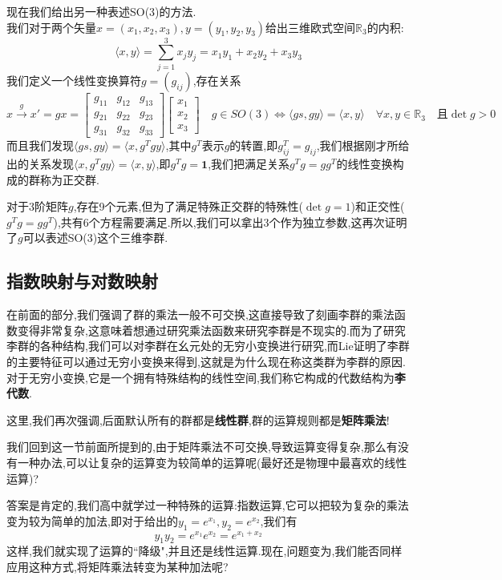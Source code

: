 \begin{example}
	现在我们给出另一种表述SO(3)的方法.\\
	我们对于两个矢量$x=(x_1,x_2,x_3),y=(y_1,y_2,y_3)$给出三维欧式空间$\mathbb{R}_3$的内积:
	\begin{equation}
		\langle x,y\rangle=\sum_{j=1}^{3}x_j y_j=x_1y_1+x_2y_2+x_3y_3
	\end{equation}
	我们定义一个线性变换算符$g=(g_{ij})$,存在关系
	\begin{equation}
		x\xrightarrow{g}x'=gx=\begin{bmatrix}g_{11}&g_{12}&g_{13}\\g_{21}&g_{22}&g_{23}\\g_{31}&g_{32}&g_{33}\end{bmatrix}\begin{bmatrix}x_1\\x_2\\x_3\end{bmatrix}\quad g\in SO(3)\Leftrightarrow\langle gs,gy\rangle=\langle x,y\rangle\quad\forall x,y\in\mathbb{R}_3\quad\text{且}\det g>0
	\end{equation}
	而且我们发现$\langle gs,gy\rangle=\langle x,g^Tgy\rangle$,其中$g^T$表示$g$的转置,即$g_{ij}^T=g_{ij}$,我们根据刚才所给出的关系发现$\langle x,g^Tgy\rangle=\langle x,y\rangle$,即$g^Tg=\textbf{1}$,我们把满足关系$g^Tg=gg^T$的线性变换构成的群称为正交群.
	
	对于3阶矩阵$g$,存在9个元素,但为了满足特殊正交群的特殊性($\det g=1$)和正交性($g^Tg=gg^T$),共有6个方程需要满足.所以,我们可以拿出3个作为独立参数,这再次证明了$g$可以表述SO(3)这个三维李群.
\end{example}
\subsection{指数映射与对数映射}
在前面的部分,我们强调了群的乘法一般不可交换,这直接导致了刻画李群的乘法函数变得非常复杂,这意味着想通过研究乘法函数来研究李群是不现实的.而为了研究李群的各种结构,我们可以对李群在幺元处的无穷小变换进行研究,而Lie证明了李群的主要特征可以通过无穷小变换来得到,这就是为什么现在称这类群为李群的原因.对于无穷小变换,它是一个拥有特殊结构的线性空间,我们称它构成的代数结构为\textbf{李代数}.

这里,我们再次强调,后面默认所有的群都是\textbf{线性群},群的运算规则都是\textbf{矩阵乘法}!

我们回到这一节前面所提到的,由于矩阵乘法不可交换,导致运算变得复杂,那么有没有一种办法,可以让复杂的运算变为较简单的运算呢(最好还是物理中最喜欢的线性运算)?

答案是肯定的,我们高中就学过一种特殊的运算:指数运算,它可以把较为复杂的乘法变为较为简单的加法,即对于给出的$y_1=e^{x_1},y_2=e^{x_2}$,我们有
\begin{equation}
	y_1y_2=e^{x_1}e^{x_2}=e^{x_1+x_2}
\end{equation}
这样,我们就实现了运算的``降级",并且还是线性运算.现在,问题变为,我们能否同样应用这种方式,将矩阵乘法转变为某种加法呢?

